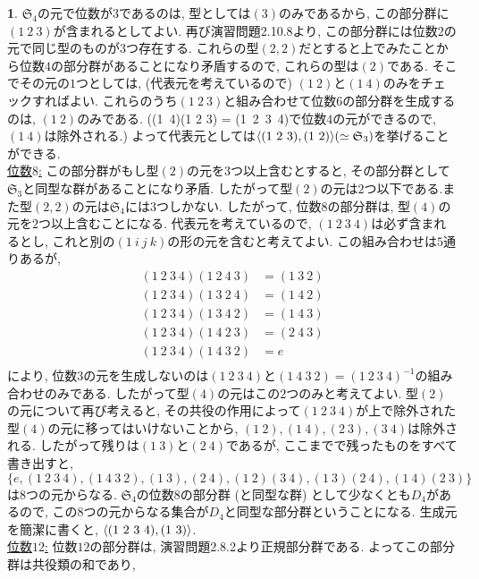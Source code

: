 \documentclass{amsart}
\theoremstyle{definition}
\newtheorem{ans}{}
\numberwithin{ans}{subsection}
\DeclarePairedDelimiter{\gen}{\langle}{\rangle}
\begin{document}
\begin{ans}
  $\mathfrak{S}_4$の元で位数が$3$であるのは, 型としては$(3)$のみであるから,
  この部分群に$(1\ 2\ 3)$が含まれるとしてよい. 再び演習問題2.10.8より, この部分群には位数$2$の元で同じ型のものが$3$つ存在する.
  これらの型$(2, 2)$だとすると上でみたことから位数$4$の部分群があることになり矛盾するので, これらの型は$(2)$である.
  そこでその元の$1$つとしては, (代表元を考えているので) $(1\ 2)$と$(1\ 4)$のみをチェックすればよい.
  これらのうち$(1\ 2\ 3)$と組み合わせて位数$6$の部分群を生成するのは, $(1\ 2)$のみである.
  ((1\ 4)(1 2 3) = (1\ 2\ 3\ 4)で位数$4$の元ができるので, $(1\ 4)$は除外される.)
  よって代表元としては$\gen{(1\ 2\ 3), (1\ 2)} (\simeq \mathfrak{S}_3)$を挙げることができる.\\
  \underline{位数$8$:}
  この部分群がもし型$(2)$の元を3つ以上含むとすると, その部分群として$\mathfrak{S}_3$と同型な群があることになり矛盾.
  したがって型$(2)$の元は$2$つ以下である.また型$(2, 2)$の元は$\mathfrak{S}_4$には3つしかない.
  したがって, 位数$8$の部分群は, 型$(4)$の元を$2$つ以上含むことになる.
  代表元を考えているので, $(1\ 2\ 3\ 4)$は必ず含まれるとし, これと別の$(1\ i\ j\ k)$の形の元を含むと考えてよい.
  この組み合わせは$5$通りあるが,
  \begin{align*}
    (1\ 2\ 3\ 4)(1\ 2\ 4\ 3) &= (1\ 3\ 2)\\
    (1\ 2\ 3\ 4)(1\ 3\ 2\ 4) &= (1\ 4\ 2)\\
    (1\ 2\ 3\ 4)(1\ 3\ 4\ 2) &= (1\ 4\ 3)\\
    (1\ 2\ 3\ 4)(1\ 4\ 2\ 3) &= (2\ 4\ 3)\\
    (1\ 2\ 3\ 4)(1\ 4\ 3\ 2) &= e\\
  \end{align*}
  により, 位数$3$の元を生成しないのは$(1\ 2\ 3\ 4)$と$(1\ 4\ 3\ 2) = (1\ 2\ 3\ 4)^{-1}$の組み合わせのみである.
  したがって型$(4)$の元はこの$2$つのみと考えてよい.
  型$(2)$の元について再び考えると, その共役の作用によって$(1\ 2\ 3\ 4)$が上で除外された型$(4)$の元に移ってはいけないことから,
  $(1\ 2), (1\ 4), (2\ 3), (3\ 4)$は除外される. したがって残りは$(1\ 3)$と$(2\ 4)$であるが,
  ここまでで残ったものをすべて書き出すと,
  $\{e, (1\ 2\ 3\ 4), (1\ 4\ 3\ 2), (1\ 3), (2\ 4), (1\ 2)(3\ 4), (1\ 3)(2\ 4), (1\ 4)(2\ 3) \}$
  は$8$つの元からなる. $\mathfrak{S_4}$の位数$8$の部分群 (と同型な群) として少なくとも$D_4$があるので,
  この$8$つの元からなる集合が$D_4$と同型な部分群ということになる.
  生成元を簡潔に書くと, $\gen{(1\ 2\ 3\ 4), (1\ 3)}$.\\
  \underline{位数$12$:}
  位数$12$の部分群は, 演習問題2.8.2より正規部分群である.
  よってこの部分群は共役類の和であり,

\end{ans}
\end{document}
